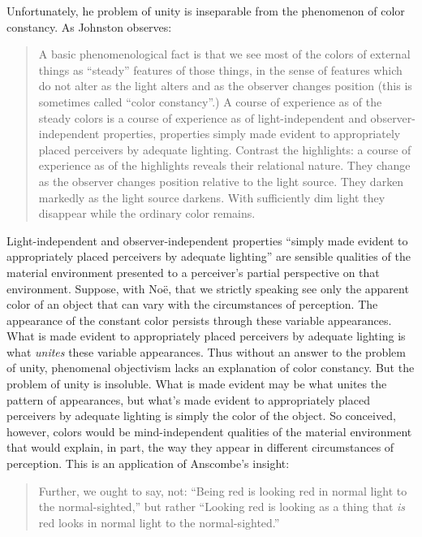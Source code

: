 \documentclass[12pt]{article}
\begin{document}
Unfortunately, he problem of unity is inseparable from the phenomenon of color constancy. As Johnston observes: 
	\begin{quote}
		A basic phenomenological fact is that we see most of the colors of external things as ``steady'' features of those things, in the sense of features which do not alter as the light alters and as the observer changes position (this is sometimes called ``color constancy''.) A course of experience as of the steady colors is a course of experience as of light-independent and observer-independent properties, properties simply made evident to appropriately placed perceivers by adequate lighting. Contrast the highlights: a course of experience as of the highlights reveals their relational nature. They change as the observer changes position relative to the light source. They darken markedly as the light source darkens. With sufficiently dim light they disappear while the ordinary color remains. \citep[141]{Johnston:1992ck} 
	\end{quote}
Light-independent and observer-independent properties ``simply made evident to appropriately placed perceivers by adequate lighting'' are sensible qualities of the material environment presented to a perceiver's partial perspective on that environment. Suppose, with Noë, that we strictly speaking see only the apparent color of an object that can vary with the circumstances of perception. The appearance of the constant color persists through these variable appearances. What is made evident to appropriately placed perceivers by adequate lighting is what \emph{unites} these variable appearances. Thus without an answer to the problem of unity, phenomenal objectivism lacks an explanation of color constancy. But the problem of unity is insoluble. What is made evident may be what unites the pattern of appearances, but what's made evident to appropriately placed perceivers by adequate lighting is simply the color of the object. So conceived, however, colors would be mind-independent qualities of the material environment that would explain, in part, the way they appear in different circumstances of perception. This is an application of Anscombe's insight: 
	\begin{quote}
		Further, we ought to say, not: ``Being red is looking red in normal light to the normal-sighted,'' but rather ``Looking red is looking as a thing that \emph{is} red looks in normal light to the normal-sighted.'' \citep[14]{Anscombe:1981fk} 
\end{quote}
\end{document}
